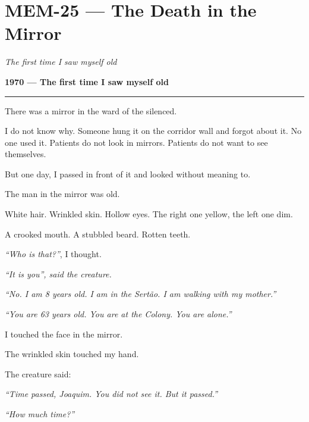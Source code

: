 \section*{\textbf{MEM-25} --- The Death in the Mirror}

\noindent \textit{The first time I saw myself old}

\noindent \textbf{1970 --- The first time I saw myself old}

\vspace{0.5em}\noindent\rule{\textwidth}{0.5pt}\vspace{0.5em}

\noindent There was a mirror in the ward of the silenced.

\noindent I do not know why. Someone hung it on the corridor wall and forgot about it. No one used it. Patients do not look in mirrors. Patients do not want to see themselves.

\noindent But one day, I passed in front of it and looked without meaning to.

\noindent The man in the mirror was old.

\noindent White hair. Wrinkled skin. Hollow eyes. The right one yellow, the left one dim.

\noindent A crooked mouth. A stubbled beard. Rotten teeth.

\noindent \textit{\textquotedblleft{}Who is that?\textquotedblright{}}, I thought.

\noindent \textit{\textquotedblleft{}It is you\textquotedblright{}, said the creature.}

\noindent \textit{\textquotedblleft{}No. I am 8 years old. I am in the Sertão. I am walking with my mother.\textquotedblright{}}

\noindent \textit{\textquotedblleft{}You are 63 years old. You are at the Colony. You are alone.\textquotedblright{}}

\noindent I touched the face in the mirror.

\noindent The wrinkled skin touched my hand.

\noindent The creature said:

\noindent \textit{\textquotedblleft{}Time passed, Joaquim. You did not see it. But it passed.\textquotedblright{}}

\noindent \textit{\textquotedblleft{}How much time?\textquotedblright{}}

